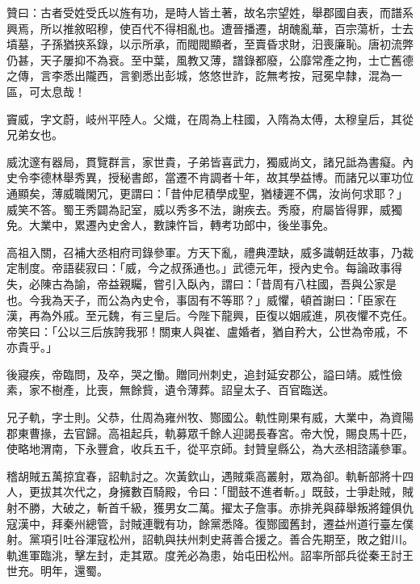 \begin{pinyinscope}
 贊曰：古者受姓受氏以旌有功，是時人皆土著，故名宗望姓，舉郡國自表，而譜系興焉，所以推敘昭穆，使百代不得相亂也。遭晉播遷，胡醜亂華，百宗蕩析，士去墳墓，子孫猶挾系錄，以示所承，而閥閥顯者，至賣昏求財，汨喪廉恥。唐初流弊仍甚，天子屢抑不為衰。至中葉，風教又薄，譜錄都廢，公靡常產之拘，士亡舊德之傳，言李悉出隴西，言劉悉出彭城，悠悠世詐，訖無考按，冠冕皁隸，混為一區，可太息哉！



 竇威，字文蔚，岐州平陸人。父熾，在周為上柱國，入隋為太傅，太穆皇后，其從兄弟女也。



 威沈邃有器局，貫覽群言，家世貴，子弟皆喜武力，獨威尚文，諸兄詆為書癡。內史令李德林舉秀異，授秘書郎，當遷不肯調者十年，故其學益博。而諸兄以軍功位通顯矣，薄威職閑冗，更謂曰：「昔仲尼積學成聖，猶棲遲不偶，汝尚何求耶？」威笑不答。蜀王秀闢為記室，威以秀多不法，謝疾去。秀廢，府屬皆得罪，威獨免。大業中，累遷內史舍人，數諫忤旨，轉考功郎中，後坐事免。



 高祖入關，召補大丞相府司錄參軍。方天下亂，禮典湮缺，威多識朝廷故事，乃裁定制度。帝語裴寂曰：「威，今之叔孫通也。」武德元年，授內史令。每論政事得失，必陳古為諭，帝益親矚，嘗引入臥內，謂曰：「昔周有八柱國，吾與公家是也。今我為天子，而公為內史令，事固有不等耶？」威懼，頓首謝曰：「臣家在漢，再為外戚。至元魏，有三皇后。今陛下龍興，臣復以姻戚進，夙夜懼不克任。帝笑曰：「公以三后族誇我邪！關東人與崔、盧婚者，猶自矜大，公世為帝戚，不亦貴乎。」



 後寢疾，帝臨問，及卒，哭之慟。贈同州刺史，追封延安郡公，謚曰靖。威性儉素，家不樹產，比喪，無餘貲，遺令薄葬。詔皇太子、百官臨送。



 兄子軌，字士則。父恭，仕周為雍州牧、酂國公。軌性剛果有威，大業中，為資陽郡東曹掾，去官歸。高祖起兵，軌募眾千餘人迎謁長春宮。帝大悅，賜良馬十匹，使略地渭南，下永豐倉，收兵五千，從平京師。封贊皇縣公，為大丞相諮議參軍。



 稽胡賊五萬掠宜春，詔軌討之。次黃欽山，遇賊乘高叢射，眾為卻。軌斬部將十四人，更拔其次代之，身擁數百騎殿，令曰：「聞鼓不進者斬。」既鼓，士爭赴賊，賊射不勝，大破之，斬首千級，獲男女二萬。擢太子詹事。赤排羌與薛舉叛將鐘俱仇寇漢中，拜秦州總管，討賊連戰有功，餘黨悉降。復酂國舊封，遷益州道行臺左僕射。黨項引吐谷渾寇松州，詔軌與扶州刺史蔣善合援之。善合先期至，敗之鉗川。軌進軍臨洮，擊左封，走其眾。度羌必為患，始屯田松州。詔率所部兵從秦王討王世充。明年，還蜀。




\end{pinyinscope}
